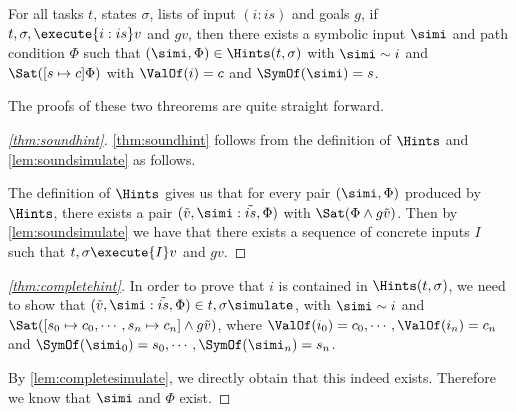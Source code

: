 \begin{theorem}
  \label{thm:completehint}
  For all tasks $t$, states $\sigma$, lists of input $(i:is)$ and goals $g$,
  if $t,\sigma,\execute{i:is} v$ and $g v$, then there exists a symbolic input $\simi$ and path condition $\Phi$
  such that $(\simi,\Phi)\in\Hints(t,\sigma)$ with $\simi\sim i$ and $\Sat([s\mapsto c]\Phi)$ with $\ValOf(i)=c$ and $\SymOf(\simi)=s$.
\end{theorem}


The proofs of these two threorems are quite straight forward.

\begin{proof}[\cref{thm:soundhint}]
  \cref{thm:soundhint} follows from the definition of $\Hints$ and \cref{lem:soundsimulate} as follows.

  The definition of $\Hints$ gives us that for every pair $(\simi,\Phi)$ produced by $\Hints$,
  there exists a pair $(\tilde{v},\simi:\tilde{is},\Phi)$ with $\Sat(\Phi\land g \tilde{v})$.
  Then by \cref{lem:soundsimulate} we have that there exists a sequence of concrete inputs $I$ such that
  $t,\sigma\execute{I}v$ and $g v$.
\end{proof}


\begin{proof}[\cref{thm:completehint}]
  In order to prove that $i$ is contained in $\Hints(t,\sigma)$, we need to show that $(\tilde{v},\simi:\tilde{is},\Phi)\in t,\sigma\simulate$, with $\simi\sim i$ and $\Sat([s_0\mapsto c_0,\cdots,s_n\mapsto c_n]\land g\tilde{v})$, where $\ValOf(i_0)=c_0,\cdots,\ValOf(i_n)=c_n$ and $\SymOf(\simi_0)=s_0,\cdots,\SymOf(\simi_n)=s_n$.

  By \cref{lem:completesimulate}, we directly obtain that this indeed exists. Therefore we know that $\simi$ and $\Phi$ exist.
\end{proof}
